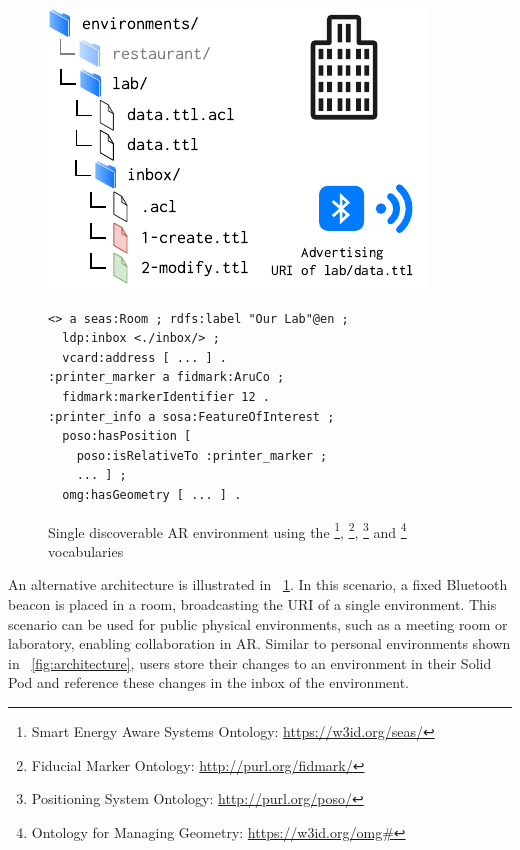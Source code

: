 \begin{figure}[htb]
\begin{minipage}{1\columnwidth}
\begin{minipage}{.44\columnwidth}
\centering
    \includegraphics[scale=0.90]{images/sosy_architecture_2.pdf}
\end{minipage}
\begin{minipage}{.55\columnwidth}
\begin{verbatim}
<> a seas:Room ; rdfs:label "Our Lab"@en ;
  ldp:inbox <./inbox/> ;
  vcard:address [ ... ] .
:printer_marker a fidmark:AruCo ;
  fidmark:markerIdentifier 12 .
:printer_info a sosa:FeatureOfInterest ;
  poso:hasPosition [ 
    poso:isRelativeTo :printer_marker ;
    ... ] ;
  omg:hasGeometry [ ... ] .
\end{verbatim}
\end{minipage}
\caption[Single discoverable AR environment]{Single discoverable AR environment using the 
\footnote{Smart Energy Aware Systems Ontology: \url{https://w3id.org/seas/}}, \footnote{Fiducial Marker Ontology: \url{http://purl.org/fidmark/}}, \footnote{Positioning System Ontology: \url{http://purl.org/poso/}} and \footnote{Ontology for Managing Geometry: \url{https://w3id.org/omg\#}} vocabularies}
\label{fig:architecture_2}
\end{minipage}
\vspace{-0.1cm}
\end{figure}

An alternative architecture is illustrated in \figurename~\ref{fig:architecture_2}. In this scenario, a fixed Bluetooth beacon is placed in a room, broadcasting the URI of a single environment. This scenario can be used for public physical environments, such as a meeting room or laboratory, enabling collaboration in AR. Similar to personal environments shown in \figurename~\ref{fig:architecture}, users store their changes to an environment in their Solid Pod and reference these changes in the inbox of the environment.

